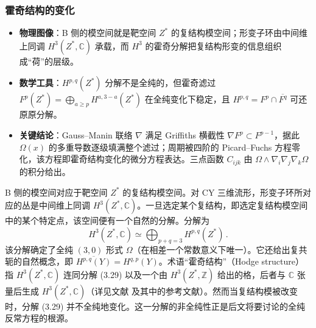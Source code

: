 \subsubsection{霍奇结构的变化}
\label{sec:3.5.2}

\begin{keytakeaways}
  \begin{itemize}[leftmargin=1.4em,itemsep=2pt,topsep=2pt]
    \item \textbf{物理图像}：B 侧的模空间就是靶空间 $Z^*$ 的复结构模空间；形变子环由中间维上同调 $H^3(Z^*,\mathbb{C})$ 承载，而 $H^3$ 的霍奇分解把复结构形变的信息组织成“荷”的层级。
    \item \textbf{数学工具}：$H^{p,q}(Z^*)$ 分解不是全纯的，但霍奇滤过 $F^p(Z^*)=\bigoplus_{a\ge p}H^{a,3-a}(Z^*)$ 在全纯变化下稳定，且 $H^{p,q}=F^p\cap\overline{F^q}$ 可还原原分解。
    \item \textbf{关键结论}：Gauss--Manin 联络 $\nabla$ 满足 Griffiths 横截性 $\nabla F^p\subset F^{p-1}$，据此 $\Omega(x)$ 的多重导数逐级填满整个滤过；周期被四阶的 Picard--Fuchs 方程零化，该方程即霍奇结构变化的微分方程表达。三点函数 $C_{ijk}$ 由 $\Omega\wedge\nabla_i\nabla_j\nabla_k\Omega$ 的积分给出。
  \end{itemize}
\end{keytakeaways}

B 侧的模空间对应于靶空间 $Z^*$ 的复结构模空间。对 CY 三维流形，形变子环所对应的丛是中间维上同调 $H^3(Z^*,\mathbb{C})$。一旦选定某个复结构，即选定复结构模空间中的某个特定点，该空间便有一个自然的分解。分解为
\begin{equation}\tag{3.29}
H^3(Z^*,\mathbb{C})\simeq\bigoplus_{p+q=3}H^{p,q}(Z^*)\,.
\end{equation}
该分解确定了全纯 $(3,0)$ 形式 $\Omega$（在相差一个常数意义下唯一）。它还给出复共轭的自然概念，即 $\overline{H^{p,q}(Y)}=H^{q,p}(Y)$。术语“霍奇结构”（Hodge structure）指 $H^3(Z^*,\mathbb{C})$ 连同分解 (3.29) 以及一个由 $H^3(Z^*,\mathbb{Z})$ 给出的格，后者与 $\mathbb{C}$ 张量后生成 $H^3(Z^*,\mathbb{C})$（详见文献 \cite{ref48,ref49} 及其中的参考文献）。然而当复结构模被改变时，分解 (3.29) 并不全纯地变化。这一分解的非全纯性正是后文将要讨论的全纯反常方程的根源。

